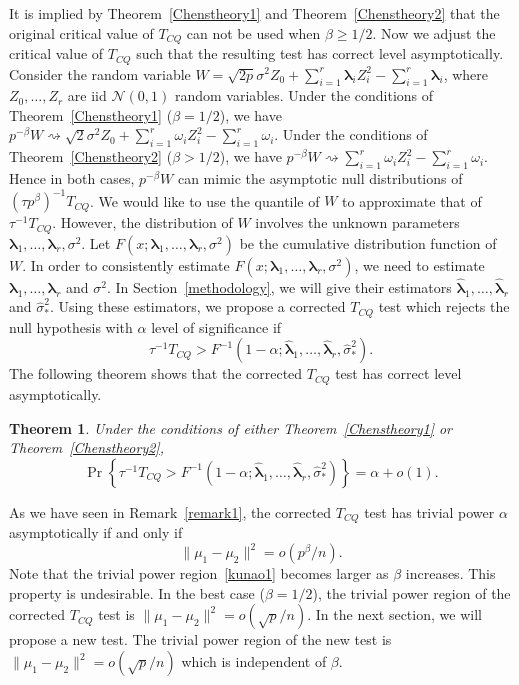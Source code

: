 \documentclass[times,sort&compress,3p]{elsarticle}
\newcommand{\bfsym}[1]{\ensuremath{\boldsymbol{#1}}}
\def\blambda {\bfsym {\lambda}}        \def\bLambda {\bfsym {\Lambda}}
\theoremstyle{plain}
\newtheorem{theorem}{\quad\quad Theorem}
\theoremstyle{definition}
\theoremstyle{remark}
\begin{document}
It is implied by Theorem~\ref{Chenstheory1} and Theorem~\ref{Chenstheory2} that the original critical value of $T_{CQ}$ can not be used when $\beta\geq 1/2$.
Now we adjust the critical value of $T_{CQ}$ such that the resulting test has correct level asymptotically.
Consider the random variable
$
W=
\sqrt{2p}\sigma^2 Z_0
+
        \sum_{i=1}^r \blambda_i Z_i^2
            -
        \sum_{i=1}^r \blambda_i
        $, 
where $Z_0,\ldots,Z_r$ are iid $\mathcal{N}(0,1)$ random variables.
Under the conditions of Theorem~\ref{Chenstheory1} ($\beta=1/2$), we have
$
  p^{-\beta}W\rightsquigarrow
\sqrt{2}\sigma^2 Z_0 + \sum_{i=1}^r \omega_i Z_i^2 -\sum_{i=1}^r \omega_i
$.
Under the conditions of Theorem~\ref{Chenstheory2} ($\beta>1/2$), we have
$
 p^{-\beta}W\rightsquigarrow
\sum_{i=1}^r \omega_i Z_i^2 -\sum_{i=1}^r \omega_i.
$
Hence in both cases, $p^{-\beta}W$ can mimic the asymptotic null distributions of $(\tau p^{\beta})^{-1}T_{CQ}$.
We would like to use the quantile of $W$ to approximate that of $\tau^{-1}T_{CQ}$.
        However, the distribution of $W$ involves the unknown parameters $\blambda_1,\ldots,\blambda_r,\sigma^2$.
Let $F(x;\blambda_1,\ldots,\blambda_r,\sigma^2)$ be the cumulative distribution function of $W$.
In order to consistently estimate $F(x;\blambda_1,\ldots,\blambda_r,\sigma^2)$, we need to estimate $\blambda_1,\ldots,\blambda_r$ and $\sigma^2$.
In Section~\ref{methodology}, we will give their estimators $\hat{\blambda}_1,\ldots,\hat{\blambda}_r$ and $\hat{\sigma}_{*}^2$. 
Using these estimators, we propose a corrected $T_{CQ}$ test which rejects the null hypothesis with $\alpha$ level of significance if
$$
\tau^{-1}{T_{CQ}}> F^{-1}(1-\alpha;\hat{\blambda}_1,\ldots,\hat{\blambda}_r,\hat{\sigma}_*^2).
$$
The following theorem shows that the corrected $T_{CQ}$ test has correct level asymptotically.

\begin{theorem}\label{theoremRev}
Under the conditions of either Theorem~\ref{Chenstheory1} or Theorem~\ref{Chenstheory2},
$$
\Pr\left\{\tau^{-1}{T_{CQ}}> F^{-1}(1-\alpha;\hat{\blambda}_1,\ldots,\hat{\blambda}_r,\hat{\sigma}_*^2)\right\}=\alpha+o(1).
$$
\end{theorem}





As we have seen in Remark~\ref{remark1}, the corrected $T_{CQ}$ test has trivial power $\alpha$ asymptotically if and only if
\begin{equation}\label{kunao1}
\|\mu_1-\mu_2\|^2 = o( p^{\beta}/n).
\end{equation}
Note that the trivial power region~\eqref{kunao1} becomes larger as $\beta$ increases.
This property is undesirable.
In the best case ($\beta=1/2$), the trivial power region of the corrected $T_{CQ}$ test is $\|\mu_1-\mu_2\|^2=o(\sqrt{p}/n)$.
In the next section, we will propose a new test. The trivial power region of the new test is $\|\mu_1-\mu_2\|^2=o(\sqrt{p}/n)$ which is independent of $\beta$.
\end{document}
